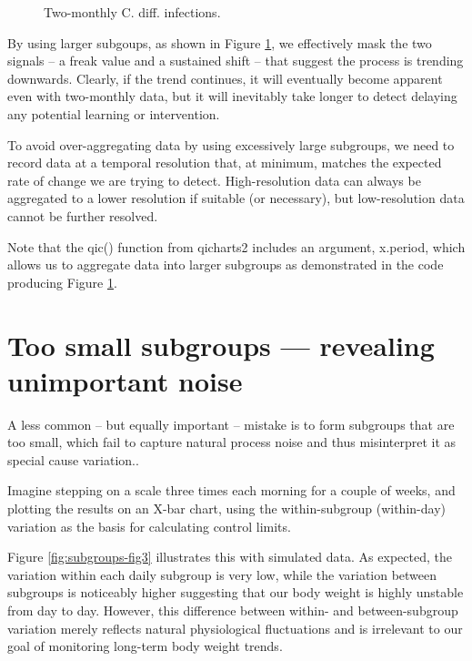 \documentclass[
]{book}
\makeatletter
\newcommand*\pandocbounded[1]{%
  \sbox\pandoc@box{#1}%
  \Gscale@div\@tempa{\textheight}{\dimexpr\ht\pandoc@box+\dp\pandoc@box\relax}%
  \Gscale@div\@tempb{\linewidth}{\wd\pandoc@box}%
  \ifdim\@tempb\p@<\@tempa\p@\let\@tempa\@tempb\fi%
  \ifdim\@tempa\p@<\p@\scalebox{\@tempa}{\usebox\pandoc@box}%
  \else\usebox{\pandoc@box}%
  \fi%
}
\makeatother
\begin{document}
\begin{figure}
\centering
\pandocbounded{}
\caption{\label{fig:subgrouping-fig2}Two-monthly C. diff. infections.}
\end{figure}

By using larger subgoups, as shown in Figure \ref{fig:subgrouping-fig2}, we effectively mask the two signals -- a freak value and a sustained shift -- that suggest the process is trending downwards. Clearly, if the trend continues, it will eventually become apparent even with two-monthly data, but it will inevitably take longer to detect delaying any potential learning or intervention.

To avoid over-aggregating data by using excessively large subgroups, we need to record data at a temporal resolution that, at minimum, matches the expected rate of change we are trying to detect. High-resolution data can always be aggregated to a lower resolution if suitable (or necessary), but low-resolution data cannot be further resolved.

Note that the qic() function from qicharts2 includes an argument, x.period, which allows us to aggregate data into larger subgroups as demonstrated in the code producing Figure \ref{fig:subgrouping-fig2}.

\section{Too small subgroups --- revealing unimportant noise}\label{too-small-subgroups-revealing-unimportant-noise}

A less common -- but equally important -- mistake is to form subgroups that are too small, which fail to capture natural process noise and thus misinterpret it as special cause variation..

Imagine stepping on a scale three times each morning for a couple of weeks, and plotting the results on an X-bar chart, using the within-subgroup (within-day) variation as the basis for calculating control limits.

Figure \ref{fig:subgroups-fig3} illustrates this with simulated data. As expected, the variation within each daily subgroup is very low, while the variation between subgroups is noticeably higher suggesting that our body weight is highly unstable from day to day. However, this difference between within- and between-subgroup variation merely reflects natural physiological fluctuations and is irrelevant to our goal of monitoring long-term body weight trends.
\end{document}
